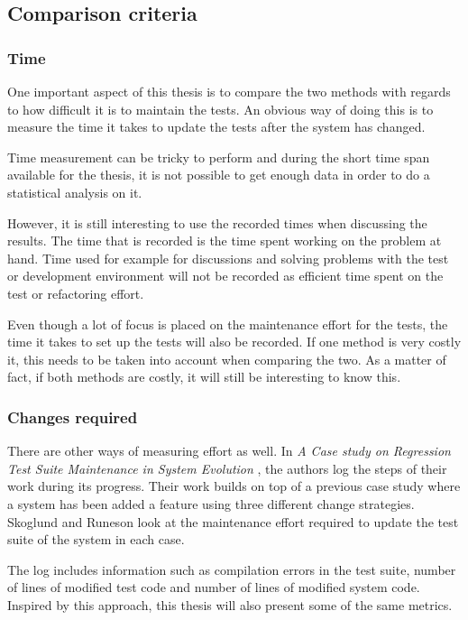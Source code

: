 \documentclass{article}
\begin{document}
		\subsection{Comparison criteria}
			\subsubsection{Time}
			One important aspect of this thesis is to compare the two methods with regards to how difficult it is to maintain the tests. An obvious way of doing this is to measure the time it takes to update the tests after the system has changed. 

			Time measurement can be tricky to perform and during the short time span available for the thesis, it is not possible to get enough data in order to do a statistical analysis on it. 

			However, it is still interesting to use the recorded times when discussing the results. The time that is recorded is the time spent working on the problem at hand. Time used for example for discussions and solving problems with the test or development environment will not be recorded as efficient time spent on the test or refactoring effort.
			
			Even though a lot of focus is placed on the maintenance effort for the tests, the time it takes to set up the tests will also be recorded. If one method is very costly it, this needs to be taken into account when comparing the two. As a matter of fact, if both methods are costly, it will still be interesting to know this.

			\subsubsection{Changes required}
			There are other ways of measuring effort as well. In {\em A Case study on Regression Test Suite Maintenance in System Evolution} \cite{regression}, the authors log the steps of their work during its progress. 
			Their work builds on top of a previous case study where a system has been added a feature using three different change strategies. Skoglund and Runeson look at the maintenance effort required to update the test suite of the system in each case. 

			The log includes information such as compilation errors in the test
			suite, number of lines of modified test code and number of lines of modified system code. Inspired by this approach, this thesis will also present some of the same metrics.
\end{document}
